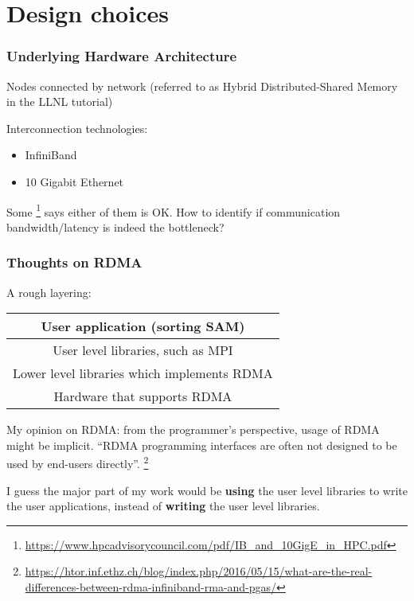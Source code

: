 \documentclass{beamer}
\begin{document}

\section{Design choices}


\begin{frame}
\frametitle{Underlying Hardware Architecture}


Nodes connected by network (referred to as Hybrid Distributed-Shared Memory in the LLNL tutorial)

Interconnection technologies:
\begin{itemize}
  \item InfiniBand
  \item 10 Gigabit Ethernet
\end{itemize}

Some \footnote{\url{https://www.hpcadvisorycouncil.com/pdf/IB\_and\_10GigE\_in\_HPC.pdf}}
says either of them is OK.
\alert{How to identify if communication bandwidth/latency is indeed the bottleneck?}

\end{frame}


\begin{frame}
\frametitle{Thoughts on RDMA}


A rough layering:

\begin{center}
    \begin{tabular}{|c|} 
    \hline
    User application (sorting SAM) \\
    \hline
    User level libraries, such as MPI \\
    \hline
    Lower level libraries which implements RDMA \\
    \hline
    Hardware that supports RDMA \\
    \hline
    \end{tabular}
\end{center}

My opinion on RDMA:
from the programmer’s perspective, usage of RDMA might be implicit.
“RDMA programming interfaces are often not designed to be used by end-users directly”.
\footnote{\url{https://htor.inf.ethz.ch/blog/index.php/2016/05/15/what-are-the-real-differences-between-rdma-infiniband-rma-and-pgas/}}

I guess the major part of my work would be \textbf{using} the user level libraries to write the user applications, 
instead of \textbf{writing} the user level libraries. 

\end{frame}
\end{document}
